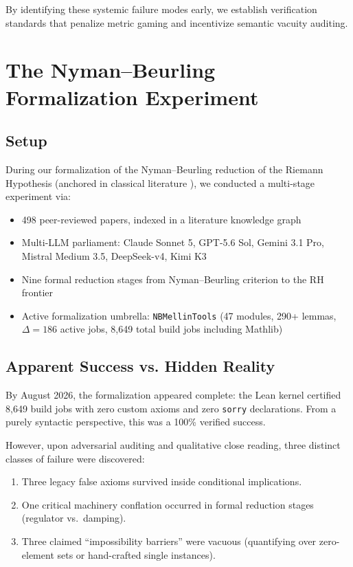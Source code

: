 \documentclass[11pt,a4paper]{article}
\theoremstyle{definition}
\theoremstyle{remark}
\begin{document}
By identifying these systemic failure modes early, we establish verification standards that penalize metric gaming and incentivize semantic vacuity auditing.

\section{The Nyman--Beurling Formalization Experiment}
\label{sec:experiment}

\subsection{Setup}

During our formalization of the Nyman--Beurling reduction of the Riemann Hypothesis (anchored in classical literature \cite{IwaniecKowalski2004,MontgomeryVaughan2007,Tenenbaum2015}), we conducted a multi-stage experiment via:

\begin{itemize}[leftmargin=2em]
  \item 498 peer-reviewed papers, indexed in a literature knowledge graph
  \item Multi-LLM parliament: Claude Sonnet 5, GPT-5.6 Sol, Gemini 3.1 Pro, Mistral Medium 3.5, DeepSeek-v4, Kimi K3
  \item Nine formal reduction stages from Nyman--Beurling criterion to the RH frontier
  \item Active formalization umbrella: \texttt{NBMellinTools} (47 modules, 290+ lemmas, $\Delta = 186$ active jobs, 8,649 total build jobs including Mathlib)
\end{itemize}

\subsection{Apparent Success vs. Hidden Reality}

By August 2026, the formalization appeared complete: the Lean kernel certified 8,649 build jobs with zero custom axioms and zero \texttt{sorry} declarations. From a purely syntactic perspective, this was a 100\% verified success.

However, upon adversarial auditing and qualitative close reading, three distinct classes of failure were discovered:
\begin{enumerate}[label=\textbf{\arabic*.}]
  \item Three legacy false axioms survived inside conditional implications.
  \item One critical machinery conflation occurred in formal reduction stages (regulator vs.~damping).
  \item Three claimed ``impossibility barriers'' were vacuous (quantifying over zero-element sets or hand-crafted single instances).
\end{enumerate}
\end{document}
